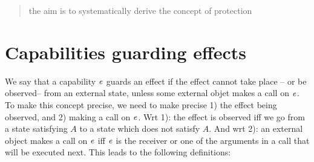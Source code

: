 \documentclass[acmsmall,review,anonymous,screen]{acmart}\settopmatter{printfolios=true,printacmref=false}
\begin{document}




  







\begin{abstract}

the aim is to systematically derive the concept of protection
\end{abstract}

\maketitle 

\section{Capabilities guarding effects}

\newcommand{\Eff}{E\!f\!f}

We say that a capability $\mathit{e}$ guards an effect %
if the effect cannot take place -- or be observed--  from an  external state, unless some external objet makes a call on $\mathit{e}$.  To make this concept precise, we need to make precise 1) the effect   being observed, and 2) making a call on $\mathit{e}$. Wrt 1): the effect   is observed iff we go from a state satisfying $A$ to a state which does not satisfy $A$. And wrt 2): an external object makes a call on $\mathit{e}$ iff $\mathit{e}$ is the receiver or one of the arguments in a call that will be executed next. This leads to the following definitions:

\end{document}
